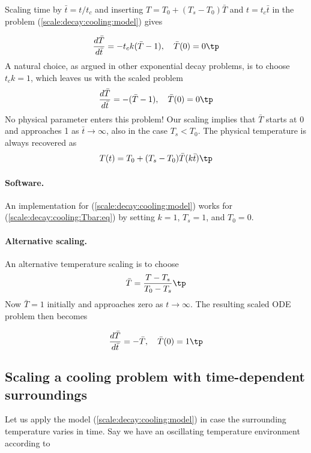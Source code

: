 \documentclass[graybox,envcountchap,sectrefs,final]{svmonodo}
\begin{document}
Scaling time by $\bar t = t/t_c$ and inserting
$T= T_0 + (T_s-T_0)\bar T$ and $t=t_c\bar t$ in the
problem (\ref{scale:decay:cooling:model}) gives

\[ \frac{d\bar T}{d\bar t} = - t_ck(\bar T - 1),\quad \bar T(0) = 0
\tp
\]
A natural choice, as argued in other exponential decay problems,
is to choose $t_ck=1$, which leaves us with the scaled problem
\begin{equation}
\frac{d\bar T}{d\bar t} = - (\bar T - 1),\quad \bar T(0)=0
\label{scale:decay:cooling:Tbar:eq}
\tp
\end{equation}
No physical parameter enters this problem!
Our scaling implies that $\bar T$ starts at
0 and approaches 1 as $\bar t\rightarrow\infty$, also in the case
$T_s < T_0$. The physical temperature is always recovered as
\begin{equation}
T(t) = T_0 + (T_s-T_0)\bar T (k\bar t)
\label{scale:decay:cooling:T}
\tp
\end{equation}

\paragraph{Software.}
An implementation for (\ref{scale:decay:cooling:model}) works for
(\ref{scale:decay:cooling:Tbar:eq}) by setting $k=1$, $T_s=1$, and $T_0=0$.

\paragraph{Alternative scaling.}
An alternative temperature scaling is to choose
\begin{equation}
\bar T = \frac{T-T_s}{T_0-T_s}
\label{scale:decay:cooling:Tbar2}
\tp
\end{equation}
Now $\bar T=1$ initially and approaches zero as $t\rightarrow\infty$.
The resulting scaled ODE problem then becomes

\begin{equation}
\frac{d\bar T}{d\bar t} = - \bar T,\quad \bar T(0)=1
\label{scale:decay:cooling:Tbar:eq2}
\tp
\end{equation}

\subsection{Scaling a cooling problem with time-dependent surroundings}
\label{scale:decay:cooling:osc}

Let us apply the model (\ref{scale:decay:cooling:model}) in
case the surrounding temperature varies in time. Say we have
an oscillating temperature environment according to
\end{document}
